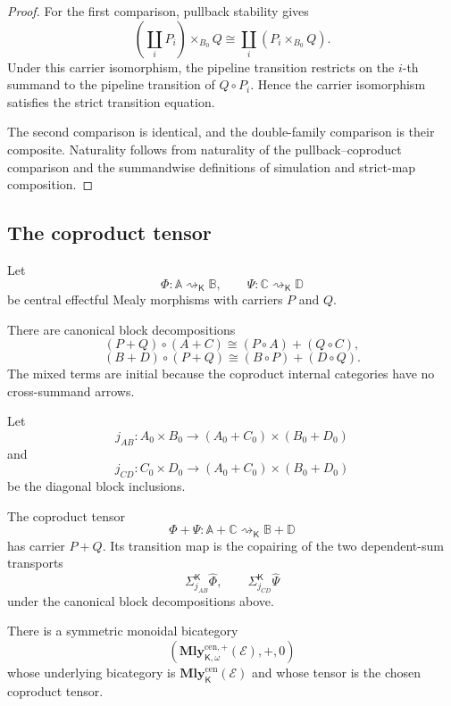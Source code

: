 \begin{proof}
For the first comparison, pullback stability gives
\[
    \left(
        \coprod_iP_i
    \right)
    \times_{B_0}Q
    \cong
    \coprod_i
    \left(
        P_i\times_{B_0}Q
    \right).
\]
Under this carrier isomorphism, the pipeline transition restricts on the
\(i\)-th summand to the pipeline transition of \(Q\circ P_i\).  Hence the
carrier isomorphism satisfies the strict transition equation.

The second comparison is identical, and the double-family comparison is
their composite.  Naturality follows from naturality of the
pullback--coproduct comparison and the summandwise definitions of simulation
and strict-map composition.
\end{proof}

\subsection{The coproduct tensor}
\label{subsec:effectful-coproduct-tensor}

Let
\[
    \Phi:
    \mathbb A\rightsquigarrow_{\mathsf K}\mathbb B,
    \qquad
    \Psi:
    \mathbb C\rightsquigarrow_{\mathsf K}\mathbb D
\]
be central effectful Mealy morphisms with carriers \(P\) and \(Q\).

There are canonical block decompositions
\[
    (P+Q)\circ(A+C)
    \cong
    (P\circ A)+(Q\circ C),
\]
\[
    (B+D)\circ(P+Q)
    \cong
    (B\circ P)+(D\circ Q).
\]
The mixed terms are initial because the coproduct internal categories have no
cross-summand arrows.

Let
\[
    j_{AB}:
    A_0\times B_0
    \longrightarrow
    (A_0+C_0)\times(B_0+D_0)
\]
and
\[
    j_{CD}:
    C_0\times D_0
    \longrightarrow
    (A_0+C_0)\times(B_0+D_0)
\]
be the diagonal block inclusions.

\begin{definition}
\label{def:coproduct-tensor-effectful-mealy}
The coproduct tensor
\[
    \Phi+\Psi:
    \mathbb A+\mathbb C
    \rightsquigarrow_{\mathsf K}
    \mathbb B+\mathbb D
\]
has carrier \(P+Q\).  Its transition map is the copairing of the two
dependent-sum transports
\[
    \Sigma_{j_{AB}}^{\mathsf K}\widehat\Phi,
    \qquad
    \Sigma_{j_{CD}}^{\mathsf K}\widehat\Psi
\]
under the canonical block decompositions above.
\end{definition}

\begin{theorem}
\label{thm:central-effectful-coproduct-monoidal-bicategory}
There is a symmetric monoidal bicategory
\[
    \left(
        \mathbf{Mly}^{\mathrm{cen},+}_{\mathsf K,\omega}(\mathcal E),
        +,
        0
    \right)
\]
whose underlying bicategory is
\(\mathbf{Mly}^{\mathrm{cen}}_{\mathsf K}(\mathcal E)\) and whose tensor is
the chosen coproduct tensor.
\end{theorem}

